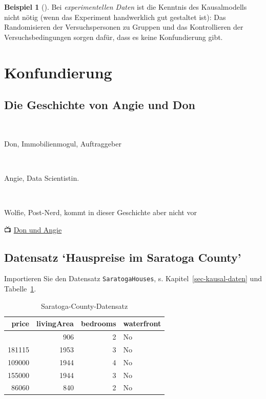 \documentclass[
  ngerman,
  letterpaper,
  twoside,
  open=any]{scrbook}
\theoremstyle{definition}
\newtheorem{example}{Beispiel}[chapter]
\theoremstyle{plain}
\theoremstyle{definition}
\theoremstyle{definition}
\theoremstyle{remark}
\begin{document}
\begin{example}[]
Bei \emph{experimentellen Daten} ist die Kenntnis des Kausalmodells
nicht nötig (wenn das Experiment handwerklich gut gestaltet ist): Das
Randomisieren der Versuchspersonen zu Gruppen und das Kontrollieren der
Versuchsbedingungen sorgen dafür, dass es keine Konfundierung gibt.

\section{Konfundierung}\label{konfundierung}

\subsection{Die Geschichte von Angie und
Don}\label{die-geschichte-von-angie-und-don}

🧑

Don, Immobilienmogul, Auftraggeber

👩

Angie, Data Scientistin.

🧞

Wolfie, Post-Nerd, kommt in dieser Geschichte aber nicht vor

📺 \href{https://www.youtube.com/watch?v=LslpcT8aosI}{Don und Angie}

\subsection{\texorpdfstring{Datensatz \enquote*{Hauspreise im Saratoga
County}}{Datensatz `Hauspreise im Saratoga County'}}\label{datensatz-hauspreise-im-saratoga-county}

Importieren Sie den Datensatz \texttt{SaratogaHouses}, s.
Kapitel~\ref{sec-kausal-daten} und Tabelle~\ref{tbl-saratoga}.

{

\begin{longtable}[]{@{}rrrl@{}}

\caption{\label{tbl-saratoga}Saratoga-County-Datensatz}

\tabularnewline

\toprule\noalign{}
price & livingArea & bedrooms & waterfront \\
\midrule\noalign{}
\endhead
\bottomrule\noalign{}
\endlastfoot
132500 & 906 & 2 & No \\
181115 & 1953 & 3 & No \\
109000 & 1944 & 4 & No \\
155000 & 1944 & 3 & No \\
86060 & 840 & 2 & No \\


\end{longtable}}
\end{example}
\end{document}
